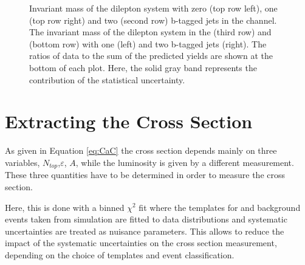 \begin{figure}[htbp!]
\begin{center}

      \caption{Invariant mass of the dilepton system with zero (top row left), one (top row right) and two (second row) b-tagged 
      jets in the \emu channel. The invariant mass of the dilepton system in the \mumu (third row) and \ee (bottom row) with one (left)
      and two b-tagged jets (right).
        The ratios of data to the sum of the predicted yields are
        shown at the bottom of each plot. Here, the solid gray band
        represents the contribution of the statistical uncertainty.}  
       \label{fig:xsec_ctrplots_mll}
  \end{center}
\end{figure}


\section{Extracting the Cross Section}
\label{sec:xsec_fit}

As given in Equation \ref{eq:CaC} the cross section depends mainly on three variables, $N_{top}$,$\varepsilon$, $A$, while the luminosity is given by a different measurement.
These three quantities have to be determined in order to measure the cross section. 

Here, this is done with a binned $\chi^2$ fit where the templates for \ttbar and background events taken from simulation are fitted to data distributions and systematic uncertainties are treated as nuisance parameters.
This allows to reduce the impact of the systematic uncertainties on the cross section measurement, depending on the choice of templates and event classification.


